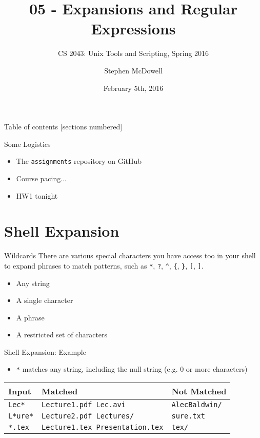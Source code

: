 \documentclass[11pt]{beamer}
\title{05 \-- Expansions and Regular Expressions}
\subtitle{CS 2043: Unix Tools and Scripting, Spring 2016 \cite{prevSemesters}}
\date{February 5th, 2016}
\author{Stephen McDowell}
\institute{Cornell University}
\begin{document}
\maketitle

\begin{frame}{Table of contents}
  [sections numbered]
  \tableofcontents[hideallsubsections]
\end{frame}

\begin{frame}{Some Logistics}
  \begin{itemize}[<+- | alert@+>]
    \item The \texttt{assignments} repository on GitHub
    \item Course pacing...
    \item HW1 tonight
  \end{itemize}
\end{frame}

%
\section{Shell Expansion}
\label{sec:shell_expansion}

\begin{frame}[fragile]{Wildcards}
  There are various special characters you have access too in your shell to expand phrases to match patterns,
  such as \texttt{*}, \texttt{?}, \texttt{\^{}}, \texttt{\{}, \texttt{\}}, \texttt{[}, \texttt{]}.
  \begin{itemize}[<+- | alert@+>]
    \item Any string
    \item A single character
    \item A phrase
    \item A restricted set of characters
  \end{itemize}
\end{frame}

\begin{frame}[fragile]{Shell Expansion: Example}
  \begin{itemize}
    \item \texttt{*} matches any string, including the null string (e.g. 0 or more characters)
  \end{itemize}
  \begin{center}
    {\small
    \begin{tabular}{|l|l|l|}
      \hline
      Input & Matched & Not Matched\\ \hline
      \texttt{Lec*} & \texttt{Lecture1.pdf Lec.avi} & \texttt{AlecBaldwin/}\\ \hline
      \texttt{L*ure*} & \texttt{Lecture2.pdf Lectures/} & \texttt{sure.txt}\\ \hline
      \texttt{*.tex} & \texttt{Lecture1.tex Presentation.tex} & \texttt{tex/}\\ \hline
    \end{tabular}
    }
  \end{center}
\end{frame}
\end{document}
